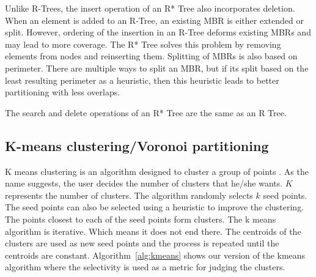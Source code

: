 Unlike R-Trees, the insert operation of an R* Tree also incorporates deletion. When an element is added to an R-Tree, an existing MBR is either extended or split. However, ordering of the insertion in an R-Tree deforms existing MBRs and may lead to more coverage. The R* Tree solves this problem by removing elements from nodes and reinserting them. Splitting of MBRs is also based on perimeter. There are multiple ways to split an MBR, but if its split based on the least resulting perimeter as a heuristic, then this heuristic leads to better partitioning with less overlaps.

The search and delete operations of an R* Tree are the same as an R Tree.

\subsection{K-means clustering/Voronoi partitioning}
K means clustering is an algorithm designed to cluster a group of points \citep{macqueen1967some}. As the name suggests, the user decides the number of clusters that he/she wants. $K$ represents the number of clusters. The algorithm randomly selects $k$ seed points. The seed points can also be selected using a heuristic to improve the clustering. The points closest to each of the seed points form clusters. The k means algorithm is iterative. Which means it does not end there. The centroids of the clusters are used as new seed points and the process is repeated until the centroids are constant. Algorithm~\ref{alg:kmeans} shows our version of the kmeans algorithm where the selectivity is used as a metric for judging the clusters.


